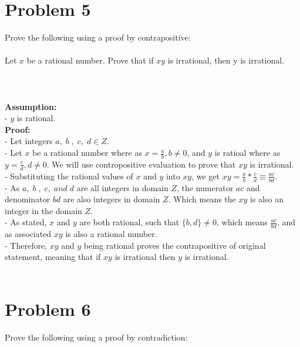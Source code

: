\documentclass{amsart}
\theoremstyle{definition}
\theoremstyle{Exercise}
\theoremstyle{remark}
\theoremstyle{rule}
\numberwithin{equation}{section}
\begin{document}
 \newpage
\vspace*{0.5in}
\section*{Problem 5}

Prove the following using a proof by contrapositive:
\\\\

Let $x$ be a rational number. Prove that if $xy$ is irrational, then y is irrational.\\\\
\\\\
\textbf{Assumption:}\\
- $y$ is rational.\\
\textbf{Proof:}\\
- Let integers $a,\;b\;,\;c,\;d \in Z$.\\
- Let $x$ be a rational number where as $x = \frac{a}{b}, b \neq 0$, and $y$ is ratioal where as $y = \frac{c}{d}, d \neq 0$. We will use contropositive evaluation to prove that $xy$ is irrational.\\
- Substituting the rational values of $x$ and $y$ into $xy$, we get $xy = \frac{a}{b} * \frac{c}{d} \equiv \frac{ac}{bd}$.\\
- As $a,\;b\;,\;c,\;and\; d$ are all integers in domain $Z$, the numerator $ac$ and denominator $bd$ are also integers in domain $Z$. Which means the $xy$ is also an integer in the domain $Z$.\\
- As stated, $x$ and $y$ are both rational, such that $\{b,d\} \neq 0$, which means $\frac{ac}{bd}$, and as associated $xy$ is also a rational number.\\
- Therefore, $xy$ and $y$ being rational proves the contrapositive of original statement, meaning that if $xy$ is irrational then $y$ is irrational. \qedsymbol
\\\\




 \newpage
\vspace*{0.5in}
\section*{Problem 6}
Prove the following using a proof by contradiction:
\\\\
\end{document}
